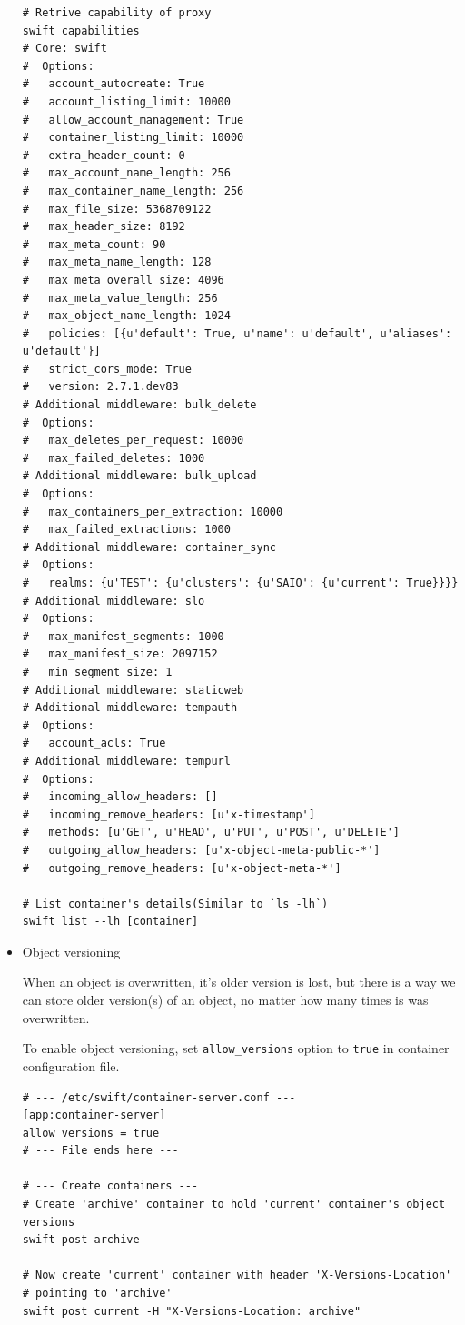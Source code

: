 \documentclass{article}
\begin{document}
\begin{itemize}
\begin{verbatim}
# Retrive capability of proxy
swift capabilities
# Core: swift
#  Options:
#   account_autocreate: True
#   account_listing_limit: 10000
#   allow_account_management: True
#   container_listing_limit: 10000
#   extra_header_count: 0
#   max_account_name_length: 256
#   max_container_name_length: 256
#   max_file_size: 5368709122
#   max_header_size: 8192
#   max_meta_count: 90
#   max_meta_name_length: 128
#   max_meta_overall_size: 4096
#   max_meta_value_length: 256
#   max_object_name_length: 1024
#   policies: [{u'default': True, u'name': u'default', u'aliases': u'default'}]
#   strict_cors_mode: True
#   version: 2.7.1.dev83
# Additional middleware: bulk_delete
#  Options:
#   max_deletes_per_request: 10000
#   max_failed_deletes: 1000
# Additional middleware: bulk_upload
#  Options:
#   max_containers_per_extraction: 10000
#   max_failed_extractions: 1000
# Additional middleware: container_sync
#  Options:
#   realms: {u'TEST': {u'clusters': {u'SAIO': {u'current': True}}}}
# Additional middleware: slo
#  Options:
#   max_manifest_segments: 1000
#   max_manifest_size: 2097152
#   min_segment_size: 1
# Additional middleware: staticweb
# Additional middleware: tempauth
#  Options:
#   account_acls: True
# Additional middleware: tempurl
#  Options:
#   incoming_allow_headers: []
#   incoming_remove_headers: [u'x-timestamp']
#   methods: [u'GET', u'HEAD', u'PUT', u'POST', u'DELETE']
#   outgoing_allow_headers: [u'x-object-meta-public-*']
#   outgoing_remove_headers: [u'x-object-meta-*']

# List container's details(Similar to `ls -lh`)
swift list --lh [container]
\end{verbatim}

\item Object versioning

When an object is overwritten, it's older version is lost, but
there is a way we can store older version(s) of an object, no
matter how many times is was overwritten.

To enable object versioning, set \texttt{allow\_versions} option to
\texttt{true} in container configuration file.
\begin{verbatim}
# --- /etc/swift/container-server.conf ---
[app:container-server]
allow_versions = true
# --- File ends here ---

# --- Create containers ---
# Create 'archive' container to hold 'current' container's object versions
swift post archive

# Now create 'current' container with header 'X-Versions-Location'
# pointing to 'archive'
swift post current -H "X-Versions-Location: archive"


\end{verbatim}
\end{itemize}
\end{document}
